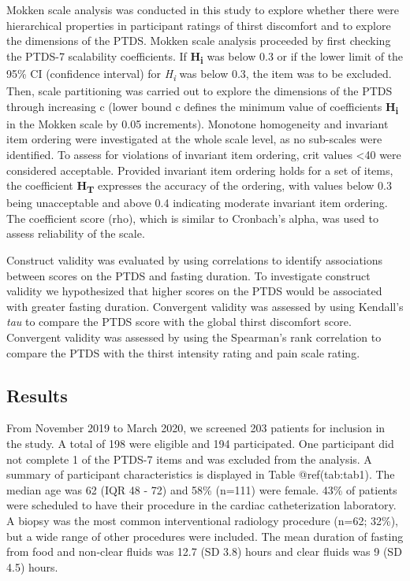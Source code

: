 \documentclass[letterpaper,9pt,twocolumn,twoside,]{pinp}
\begin{document}
Mokken scale analysis was conducted in this study to explore whether
there were hierarchical properties in participant ratings of thirst
discomfort and to explore the dimensions of the PTDS. Mokken scale
analysis proceeded by first checking the PTDS-7 scalability
coefficients. If \textbf{H\textsubscript{i}} was below 0.3 or if the
lower limit of the 95\% CI (confidence interval) for
\emph{H\textsubscript{i}} was below 0.3, the item was to be excluded.
Then, scale partitioning was carried out to explore the dimensions of
the PTDS through increasing c (lower bound c defines the minimum value
of coefficients \textbf{H\textsubscript{i}} in the Mokken scale by 0.05
increments).\citep{molenaar2000mps5} Monotone homogeneity and invariant
item ordering were investigated at the whole scale level, as no
sub-scales were identified. To assess for violations of invariant item
ordering, crit values \textless40 were considered
acceptable.\citep{molenaar2000mps5} Provided invariant item ordering
holds for a set of items, the coefficient \textbf{H\textsubscript{T}}
expresses the accuracy of the ordering, with values below 0.3 being
unacceptable and above 0.4 indicating moderate invariant item
ordering.\citep{Ligtvoet_2010} The coefficient score (rho), which is
similar to Cronbach's alpha, was used to assess reliability of the
scale.

Construct validity was evaluated by using correlations to identify
associations between scores on the PTDS and fasting duration. To
investigate construct validity we hypothesized that higher scores on the
PTDS would be associated with greater fasting duration. Convergent
validity was assessed by using Kendall's \emph{tau} to compare the PTDS
score with the global thirst discomfort score. Convergent validity was
assessed by using the Spearman's rank correlation to compare the PTDS
with the thirst intensity rating and pain scale rating.

\hypertarget{results-1}{%
\subsection{Results}\label{results-1}}

From November 2019 to March 2020, we screened 203 patients for inclusion
in the study. A total of 198 were eligible and 194 participated. One
participant did not complete 1 of the PTDS-7 items and was excluded from
the analysis. A summary of participant characteristics is displayed in
Table @ref(tab:tab1). The median age was 62 (IQR 48 - 72) and 58\%
(n=111) were female. 43\% of patients were scheduled to have their
procedure in the cardiac catheterization laboratory. A biopsy was the
most common interventional radiology procedure (n=62; 32\%), but a wide
range of other procedures were included. The mean duration of fasting
from food and non-clear fluids was 12.7 (SD 3.8) hours and clear fluids
was 9 (SD 4.5) hours.
\end{document}
